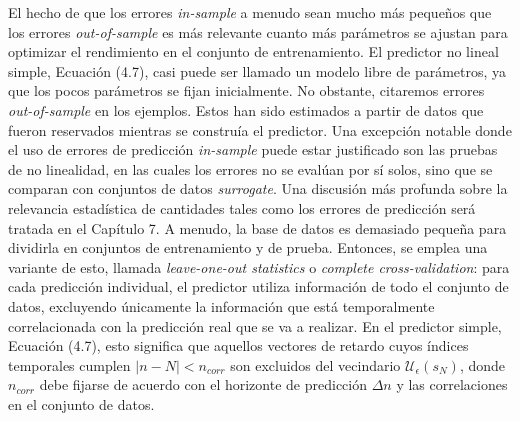 \documentclass[10pt,a4paper]{book}
\begin{document}
\bigskip

El hecho de que los errores \textit{in-sample} a menudo sean mucho más pequeños que los errores \textit{out-of-sample} es más relevante cuanto más parámetros se ajustan para optimizar el rendimiento en el conjunto de entrenamiento. El predictor no lineal simple, Ecuación (4.7), casi puede ser llamado un modelo libre de parámetros, ya que los pocos parámetros se fijan inicialmente. No obstante, citaremos errores \textit{out-of-sample} en los ejemplos. Estos han sido estimados a partir de datos que fueron reservados mientras se construía el predictor. Una excepción notable donde el uso de errores de predicción \textit{in-sample} puede estar justificado son las pruebas de no linealidad, en las cuales los errores no se evalúan por sí solos, sino que se comparan con conjuntos de datos \textit{surrogate}. Una discusión más profunda sobre la relevancia estadística de cantidades tales como los errores de predicción será tratada en el Capítulo 7. A menudo, la base de datos es demasiado pequeña para dividirla en conjuntos de entrenamiento y de prueba. Entonces, se emplea una variante de esto, llamada \textit{leave-one-out statistics} o \textit{complete cross-validation}: para cada predicción individual, el predictor utiliza información de todo el conjunto de datos, excluyendo únicamente la información que está temporalmente correlacionada con la predicción real que se va a realizar. En el predictor simple, Ecuación (4.7), esto significa que aquellos vectores de retardo cuyos índices temporales cumplen $|n - N| < n_{corr}$ son excluidos del vecindario $\mathcal{U}_\epsilon(s_N)$, donde $n_{corr}$ debe fijarse de acuerdo con el horizonte de predicción $\Delta n$ y las correlaciones en el conjunto de datos.

\newpage
\end{document}

